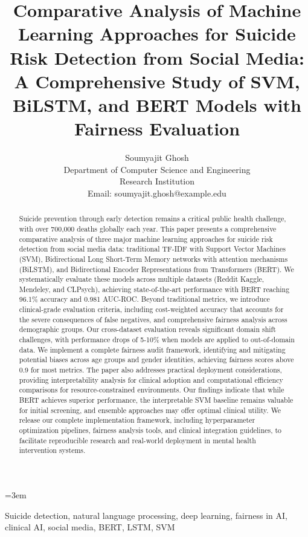 \documentclass[conference]{IEEEtran}
\title{Comparative Analysis of Machine Learning Approaches for Suicide Risk Detection from Social Media: A Comprehensive Study of SVM, BiLSTM, and BERT Models with Fairness Evaluation}
\author{Soumyajit Ghosh\\Department of Computer Science and Engineering\\Research Institution\\Email: soumyajit.ghosh@example.edu}
\begin{document}
\sloppy
\emergencystretch=3em
\maketitle

\begin{abstract}
Suicide prevention through early detection remains a critical public health challenge, with over 700,000 deaths globally each year. This paper presents a comprehensive comparative analysis of three major machine learning approaches for suicide risk detection from social media data: traditional TF-IDF with Support Vector Machines (SVM), Bidirectional Long Short-Term Memory networks with attention mechanisms (BiLSTM), and Bidirectional Encoder Representations from Transformers (BERT). We systematically evaluate these models across multiple datasets (Reddit Kaggle, Mendeley, and CLPsych), achieving state-of-the-art performance with BERT reaching 96.1\% accuracy and 0.981 AUC-ROC. Beyond traditional metrics, we introduce clinical-grade evaluation criteria, including cost-weighted accuracy that accounts for the severe consequences of false negatives, and comprehensive fairness analysis across demographic groups. Our cross-dataset evaluation reveals significant domain shift challenges, with performance drops of 5-10\% when models are applied to out-of-domain data. We implement a complete fairness audit framework, identifying and mitigating potential biases across age groups and gender identities, achieving fairness scores above 0.9 for most metrics. The paper also addresses practical deployment considerations, providing interpretability analysis for clinical adoption and computational efficiency comparisons for resource-constrained environments. Our findings indicate that while BERT achieves superior performance, the interpretable SVM baseline remains valuable for initial screening, and ensemble approaches may offer optimal clinical utility. We release our complete implementation framework, including hyperparameter optimization pipelines, fairness analysis tools, and clinical integration guidelines, to facilitate reproducible research and real-world deployment in mental health intervention systems.
\end{abstract}

\begin{IEEEkeywords}
Suicide detection, natural language processing, deep learning, fairness in AI, clinical AI, social media, BERT, LSTM, SVM
\end{IEEEkeywords}
\end{document}
